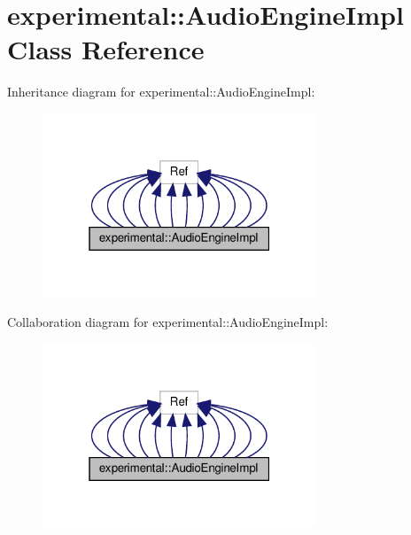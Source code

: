 \hypertarget{classexperimental_1_1AudioEngineImpl}{}\section{experimental\+:\+:Audio\+Engine\+Impl Class Reference}
\label{classexperimental_1_1AudioEngineImpl}


Inheritance diagram for experimental\+:\+:Audio\+Engine\+Impl\+:
\nopagebreak
\begin{figure}[H]
\begin{center}
\leavevmode
\includegraphics[width=232pt]{classexperimental_1_1AudioEngineImpl__inherit__graph}
\end{center}
\end{figure}


Collaboration diagram for experimental\+:\+:Audio\+Engine\+Impl\+:
\nopagebreak
\begin{figure}[H]
\begin{center}
\leavevmode
\includegraphics[width=232pt]{classexperimental_1_1AudioEngineImpl__coll__graph}
\end{center}
\end{figure}
